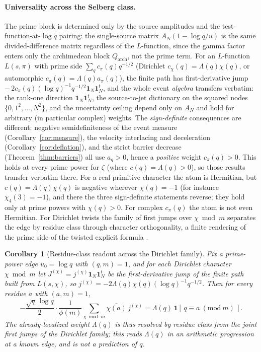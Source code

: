 \documentclass[11pt]{article}
\theoremstyle{plain}
\newtheorem{corollary}[theorem]{Corollary}
\theoremstyle{definition}
\theoremstyle{remark}
\newcommand{\one}{\mathbf 1}
\newcommand{\Lam}{\Lambda}
\begin{document}
\paragraph{Universality across the Selberg class.}
The prime block is determined only by the source amplitudes and the
test-function-at-$\log q$ pairing: the single-source matrix $A_N(1-\log q/u)$ is
the same divided-difference matrix regardless of the $L$-function, since the
gamma factor enters only the archimedean block $Q_{\mathrm{arch}}$, not the prime
term. For an $L$-function $L(s,\pi)$ with prime side $\sum_q c_\pi(q)q^{-1/2}$
(Dirichlet $c_\chi(q)=\Lam(q)\chi(q)$, or automorphic $c_\pi(q)=\Lam(q)a_\pi(q)$),
the finite path has first-derivative jump
$-\,2c_\pi(q)(\log q)^{-1}q^{-1/2}\one_N\one_N^t$, and the whole event
\emph{algebra} transfers verbatim: the rank-one direction $\one_N\one_N^t$, the
source-to-jet dictionary on the squared nodes $\{0,1^2,\dots,N^2\}$, and the
uncertainty ceiling depend only on $A_N$ and hold for arbitrary (in particular
complex) weights. The \emph{sign-definite} consequences are different: negative
semidefiniteness of the event measure (Corollary~\ref{cor:measure}), the velocity
interlacing and deceleration (Corollary~\ref{cor:deflation}), and the strict
barrier decrease (Theorem~\ref{thm:barriers}) all use $a_q>0$, hence a
\emph{positive} weight $c_\pi(q)>0$. This holds at every prime power for $\zeta$
(where $c(q)=\Lam(q)>0$), so those results transfer verbatim there. For a real
primitive character the atom is Hermitian, but $c(q)=\Lam(q)\chi(q)$ is negative
wherever $\chi(q)=-1$ (for instance $\chi_4(3)=-1$), and there the three
sign-definite statements reverse; they hold only at prime powers with
$\chi(q)>0$. For complex $c_\pi(q)$ the atom is not even Hermitian. For Dirichlet twists the family of first jumps over
$\chi\bmod m$ separates the edge by residue class through character orthogonality,
a finite rendering of the prime side of the twisted explicit formula
\cite{IwaniecKowalski2004}.

\begin{corollary}[Residue-class readout across the Dirichlet family]\label{cor:dirichlet}
Fix a prime-power edge $u_0=\log q$ with $(q,m)=1$, and for each Dirichlet
character $\chi\bmod m$ let $J^{(\chi)}=j^{(\chi)}\one_N\one_N^t$ be the
first-derivative jump of the finite path built from $L(s,\chi)$, so
$j^{(\chi)}=-2\Lam(q)\chi(q)(\log q)^{-1}q^{-1/2}$. Then for every residue $a$ with
$(a,m)=1$,
\[
 -\frac{\sqrt q\,\log q}{2}\cdot\frac{1}{\phi(m)}
 \sum_{\chi\bmod m}\overline{\chi(a)}\,j^{(\chi)}
 =\Lam(q)\,\mathbf 1[\,q\equiv a\ (\mathrm{mod}\ m)\,].
\]
The already-localized weight $\Lam(q)$ is thus resolved by residue class from the
joint first jumps of the Dirichlet family; this reads $\Lam(q)$ in an arithmetic
progression at a known edge, and is not a prediction of $q$.
\end{corollary}
\end{document}
